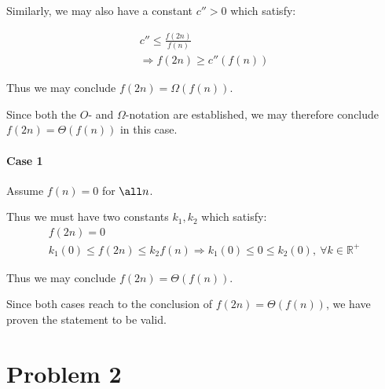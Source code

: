 \documentclass[12pt]{article}
\begin{document}
Similarly, we may also have a constant $c'' > 0$ which satisfy:


\begin{gather}
    c'' \leq \frac{f(2n)}{f(n)} \\
    \Rightarrow f(2n) \geq c''(f(n))
\end{gather}

Thus we may conclude $f(2n) = \Omega(f(n))$.\newline

Since both the $O$- and $\Omega$-notation are established, we may therefore conclude $f(2n) = \Theta(f(n))$ in this case.

\paragraph{Case 1} Assume $f(n) = 0$ for $\all n$.

Thus we must have two constants $k_{1}, k_{2}$ which satisfy:
\begin{gather}
    f(2n) = 0 \\
    k_{1}(0) \leq f(2n) \leq k_{2}f(n)\Rightarrow k_{1}(0) \leq 0 \leq k_{2}(0), \ \forall k \in \mathbb{R^+}
\end{gather}

Thus we may conclude $f(2n) = \Theta(f(n))$.\newline


Since both cases reach to the conclusion of $f(2n) = \Theta(f(n))$, we have proven the statement to be valid.



\section{Problem 2}


%
% 
% 
\end{document}
